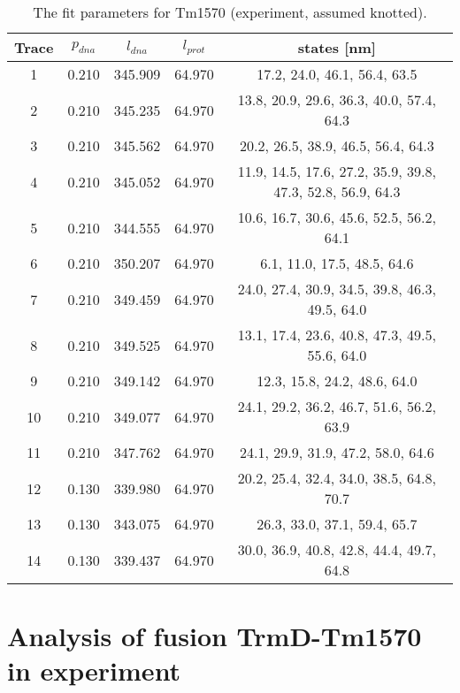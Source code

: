 \begin{table}
    \tiny
    \centering
    \caption{The fit parameters for Tm1570 (experiment, assumed knotted).}
    \label{tab:tm1570-fit-parameters-exp-knotted}
    \begin{tabular}{c|c|c|c|c}
        \textbf{Trace} & $p_{dna}$ & $l_{dna}$ & $l_{prot}$ & states [nm]\\\hline
        1 & 0.210 & 345.909 & 64.970 & 17.2, 24.0, 46.1, 56.4, 63.5\\
        2 & 0.210 & 345.235 & 64.970 & 13.8, 20.9, 29.6, 36.3, 40.0, 57.4, 64.3\\
        3 & 0.210 & 345.562 & 64.970 & 20.2, 26.5, 38.9, 46.5, 56.4, 64.3\\
        4 & 0.210 & 345.052 & 64.970 & 11.9, 14.5, 17.6, 27.2, 35.9, 39.8, 47.3, 52.8, 56.9, 64.3\\
        5 & 0.210 & 344.555 & 64.970 & 10.6, 16.7, 30.6, 45.6, 52.5, 56.2, 64.1\\
        6 & 0.210 & 350.207 & 64.970 & 6.1, 11.0, 17.5, 48.5, 64.6\\
        7 & 0.210 & 349.459 & 64.970 & 24.0, 27.4, 30.9, 34.5, 39.8, 46.3, 49.5, 64.0\\
        8 & 0.210 & 349.525 & 64.970 & 13.1, 17.4, 23.6, 40.8, 47.3, 49.5, 55.6, 64.0\\
        9 & 0.210 & 349.142 & 64.970 & 12.3, 15.8, 24.2, 48.6, 64.0\\
        10 & 0.210 & 349.077 & 64.970 & 24.1, 29.2, 36.2, 46.7, 51.6, 56.2, 63.9\\
        11 & 0.210 & 347.762 & 64.970 & 24.1, 29.9, 31.9, 47.2, 58.0, 64.6\\
        12 & 0.130 & 339.980 & 64.970 & 20.2, 25.4, 32.4, 34.0, 38.5, 64.8, 70.7\\
        13 & 0.130 & 343.075 & 64.970 & 26.3, 33.0, 37.1, 59.4, 65.7\\
        14 & 0.130 & 339.437 & 64.970 & 30.0, 36.9, 40.8, 42.8, 44.4, 49.7, 64.8\\
    \end{tabular}
\end{table}

\section{Analysis of fusion TrmD-Tm1570 in experiment}
\label{sec:fit-details-fusion-experiment}

